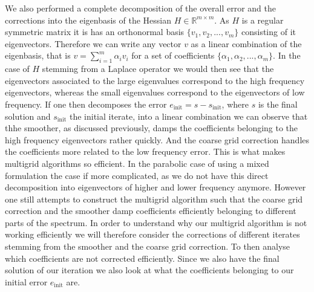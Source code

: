 \documentclass[../draft_1.tex]{subfiles}
\begin{document}
We also performed a complete decomposition  of the overall error and the corrections into the eigenbasis of the Hessian $H \in \mathbb{R}^{m \times m}$. As $H$ is a regular symmetric matrix it is has an orthonormal basis $\{v_1, v_2, ..., v_m \}$ consisting of it eigenvectors. Therefore we can write any vector $v$ as a linear combination of the eigenbasis, that is $ v= \sum_{i = 1}^{m} \alpha_i v_i$ for a set of coefficients $\{\alpha_1, \alpha_2, ..., \alpha_m \}$. In the case of $H$ stemming from a Laplace operator we would then see that the eigenvectors associated to the large eigenvalues correspond to the high frequency eigenvectors, whereas the small eigenvalues correspond to the eigenvectors of low frequency. If one then decomposes the error $e_{\text{init}} = s - s_{\text{init}} $, where $s$ is the final solution and $ s_{\text{init}}$ the initial iterate, into a linear combination we can observe that thhe smoother, as discussed previously, damps the coefficients belonging to the high frequency eigenvectors rather quickly. And the coarse grid correction handles the coefficients more related to the low frequency error. This is what makes multigrid algorithms so efficient. In the parabolic case of using a mixed formulation the case if more complicated, as we do not have this direct decomposition into eigenvectors of higher and lower frequency anymore. However one still attempts to construct the multigrid algorithm such that the coarse grid correction and the smoother damp coefficients efficiently belonging to different parts of the spectrum. In order to understand why our multigrid algorithm is not working efficiently we will therefore consider the corrections of different iterates stemming from the smoother and the coarse grid correction. To then analyse which coefficients are not corrected efficiently. Since we also have the final solution of our iteration we also look at what the coefficients belonging to our initial error $e_{\text{init}}$ are. 
\end{document}
